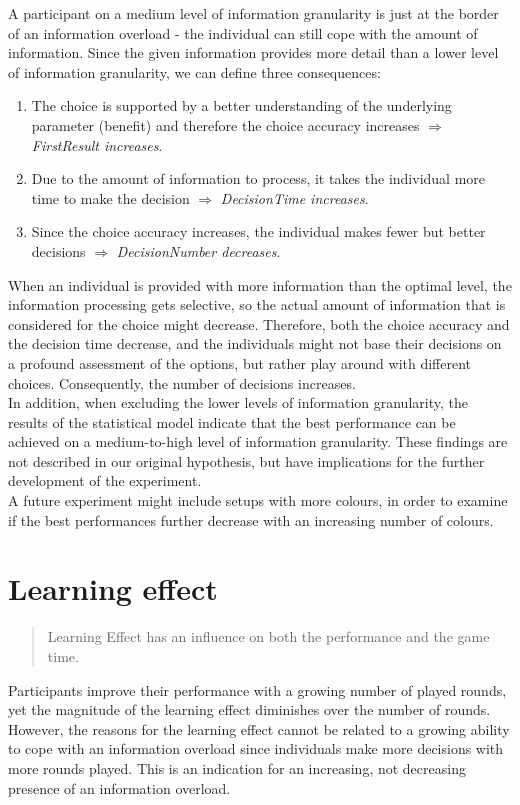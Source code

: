 A participant on a medium level of information granularity is just at the border of an information overload - the individual can still cope with the amount of information. Since the given information provides more detail than a lower level of information granularity, we can define three consequences:
\begin{enumerate}
\item The choice is supported by a better understanding of the underlying parameter (benefit) and therefore the choice accuracy increases $\Rightarrow$ \textit{FirstResult increases}.
\item Due to the amount of information to process, it takes the individual more time to make the decision $\Rightarrow$ \textit{DecisionTime increases}.
\item Since the choice accuracy increases, the individual makes fewer but better decisions $\Rightarrow$ \textit{DecisionNumber decreases}.
\end{enumerate}
When an individual is provided with more information than the optimal level, the information processing gets selective, so the actual amount of information that is considered for the choice might decrease. Therefore, both the choice accuracy and the decision time decrease, and the individuals might not base their decisions on a profound assessment of the options, but rather play around with different choices. Consequently, the number of decisions increases.\\
In addition, when excluding the lower levels of information granularity, the results of the statistical model indicate that the best performance can be achieved on a medium-to-high level of information granularity. These findings are not described in our original hypothesis, but have implications for the further development of the experiment.\\
A future experiment might include setups with more colours, in order to examine if the best performances further decrease with an increasing number of colours.
\section{Learning effect}
\begin{quote}
Learning Effect has an influence on both the performance and the game time. 
\end{quote}
Participants improve their performance with a growing number of played rounds, yet the magnitude of the learning effect diminishes over the number of rounds. However, the reasons for the learning effect cannot be related to a growing ability to cope with an information overload since individuals make more decisions with more rounds played. This is an indication for an increasing, not decreasing presence of an information overload.


